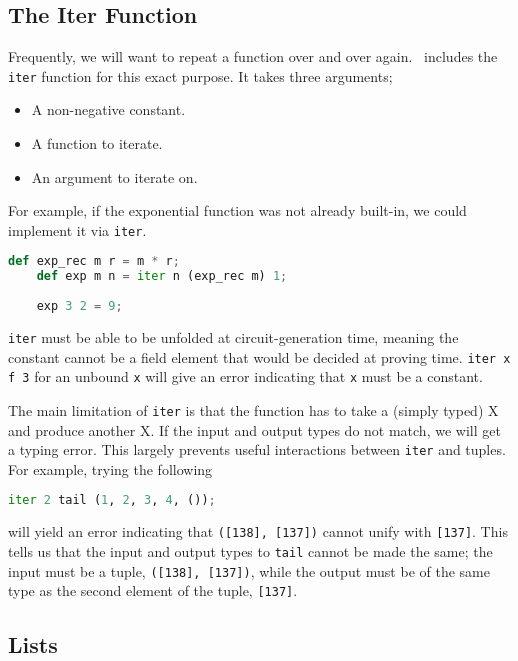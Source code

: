 \subsection{The Iter Function} \label{ITER}

Frequently, we will want to repeat a function over and over again. \vampir\ includes the \lstinline{iter} function for this exact purpose. It takes three arguments;

\begin{itemize}
\item A non-negative constant.
\item A function to iterate.
\item An argument to iterate on.
\end{itemize}

For example, if the exponential function was not already built-in, we could implement it via \lstinline{iter}.

\begin{lstlisting}[language=Python]
    def exp_rec m r = m * r;
    def exp m n = iter n (exp_rec m) 1;
    
    exp 3 2 = 9;
\end{lstlisting}

\lstinline{iter} must be able to be unfolded at circuit-generation time, meaning the constant cannot be a field element that would be decided at proving time. \lstinline{iter x f 3} for an unbound \lstinline{x} will give an error indicating that \lstinline{x} must be a constant.

The main limitation of \lstinline{iter} is that the function has to take a (simply typed) X and produce another X. If the input and output types do not match, we will get a typing error. This largely prevents useful interactions between \lstinline{iter} and tuples. For example, trying the following

\begin{lstlisting}[language=Python]
  iter 2 tail (1, 2, 3, 4, ());
\end{lstlisting}

will yield an error indicating that \lstinline{([138], [137])} cannot unify with \lstinline{[137]}. This tells us that the input and output types to \lstinline{tail} cannot be made the same; the input must be a tuple, \lstinline{([138], [137])}, while the output must be of the same type as the second element of the tuple, \lstinline{[137]}.

\subsection{Lists} \label{LIST}

